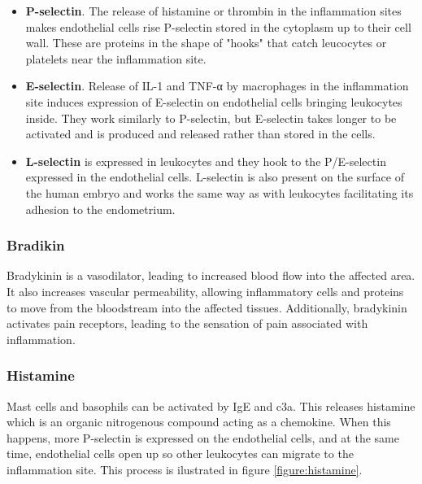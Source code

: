 \begin{itemize}

    \item {\textbf{P-selectin}}. The release of histamine or thrombin in the inflammation sites makes endothelial cells rise P-selectin stored in the cytoplasm up to their cell wall. These are proteins in the shape of "hooks" that catch leucocytes or platelets near the inflammation site.
 
    \item {\textbf{E-selectin}}. Release of IL-1 and TNF-α by macrophages in the inflammation site induces expression of E-selectin on endothelial cells bringing leukocytes inside. They work similarly to P-selectin, but E-selectin takes longer to be activated and is produced and released rather than stored in the cells.
    
    \item {\textbf{L-selectin}} is expressed in leukocytes and they hook to the P/E-selectin expressed in the endothelial cells. L-selectin is also present on the surface of the human embryo and works the same way as with leukocytes facilitating its adhesion to the endometrium.
    
\end{itemize}

\subsubsection{Bradikin}

Bradykinin is a vasodilator, leading to increased blood flow into the affected area. It also increases vascular permeability, allowing inflammatory cells and proteins to move from the bloodstream into the affected tissues. Additionally, bradykinin activates pain receptors, leading to the sensation of pain associated with inflammation.

\subsubsection{Histamine}
\label{in:histamine}

Mast cells and basophils can be activated by IgE and \gls{c3a}. This releases histamine which is an organic nitrogenous compound acting as a chemokine. When this happens, more P-selectin is expressed on the endothelial cells, and at the same time, endothelial cells open up so other leukocytes can migrate to the inflammation site. This process is ilustrated in figure \ref{figure:histamine}.

